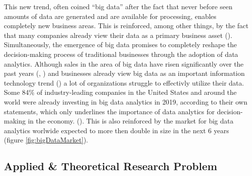 This new trend, often coined \enquote{big data} after the fact that never before seen amounts of data are generated and are available for processing, enables completely new business areas. This is reinforced, among other things, by the fact that many companies already view their data as a primary business asset (\cite{Redman.2008}). Simultaneously, the emergence of big data promises to completely reshape the decision-making process of traditional businesses through the adoption of data analytics. Although sales in the area of big data have risen significantly over the past years (\cite{BISResearch.2018}, \cite{Bitkom.2018}) and businesses already view big data as an important information technology trend (\cite{Bitkom.2017}) a lot of organizations struggle to effectivly utilize their data. Some 84\% of industry-leading companies in the United States and around the world were already investing in big data analytics in 2019, according to their own statements, which only underlines the importance of data analytics for decision-making in the economy. (\cite{statista.2019}). This is also reinforced by the market for big data analytics worlwide expected to more then double in size in the next 6 years (figure \ref{fig:bigDataMarket}).\newline




\subsection{Applied \& Theoretical Research Problem} %

